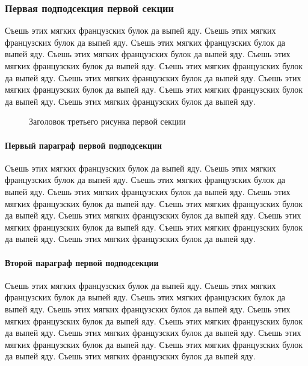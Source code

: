 \documentclass{./../class/UIR}
\begin{document}
        \subsubsection{Первая подподсекция первой секции}
        Съешь этих мягких французских булок да выпей яду. Съешь этих мягких французских булок да выпей яду. Съешь этих мягких французских булок да выпей яду. Съешь этих мягких французских булок да выпей яду. Съешь этих мягких французских булок да выпей яду. Съешь этих мягких французских булок да выпей яду. Съешь этих мягких французских булок да выпей яду. Съешь этих мягких французских булок да выпей яду. Съешь этих мягких французских булок да выпей яду. Съешь этих мягких французских булок да выпей яду.
        
        \begin{figure}
        \caption{Заголовок третьего рисунка первой секции}
        \end{figure}

            \paragraph{Первый параграф первой подподсекции}
            Съешь этих мягких французских булок да выпей яду. Съешь этих мягких французских булок да выпей яду. Съешь этих мягких французских булок да выпей яду. Съешь этих мягких французских булок да выпей яду. Съешь этих мягких французских булок да выпей яду. Съешь этих мягких французских булок да выпей яду. Съешь этих мягких французских булок да выпей яду. Съешь этих мягких французских булок да выпей яду. Съешь этих мягких французских булок да выпей яду. Съешь этих мягких французских булок да выпей яду.
            
            \paragraph{Второй параграф первой подподсекции}
            Съешь этих мягких французских булок да выпей яду. Съешь этих мягких французских булок да выпей яду. Съешь этих мягких французских булок да выпей яду. Съешь этих мягких французских булок да выпей яду. Съешь этих мягких французских булок да выпей яду. Съешь этих мягких французских булок да выпей яду. Съешь этих мягких французских булок да выпей яду. Съешь этих мягких французских булок да выпей яду. Съешь этих мягких французских булок да выпей яду. Съешь этих мягких французских булок да выпей яду.
\end{document}
